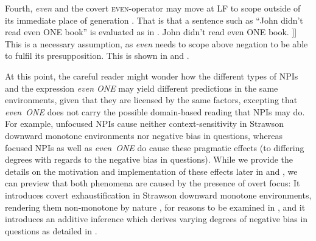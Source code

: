 Fourth, \textit{even} and the covert {\scshape even}-operator may move at LF to scope outside of its immediate place of generation \parencite[see, amongst others,][]{Karttunen1979,Wilkinson1996,Lahiri1998}. That is that a sentence such as \enquote{John didn't read even \MakeUppercase{one} book} is evaluated as in .
\pex\label{ex:even-movement}
\a John didn't read even \MakeUppercase{one} book.
\a[] [even\textsubscript{C} [not \sout{even\textsubscript{C}} [John read one\textsubscript{F} book]]]
\xe
This is a necessary assumption, as \textit{even} needs to scope above negation to be able to fulfil its presupposition. This is shown in  and .

At this point, the careful reader might wonder how the different types of NPIs and the expression \textit{even ONE} may yield different predictions in the same environments, given that they are licensed by the same factors, excepting that \textit{even~ONE} does not carry the possible domain-based reading that NPIs may do. For example, unfocused NPIs cause neither context-sensitivity in Strawson downward monotone environments nor negative bias in questions, whereas focused NPIs as well as \textit{even~ONE} do cause these pragmatic effects (to differing degrees with regards to the negative bias in questions). While we provide the details on the motivation and implementation of these effects later in  and , we can preview that both phenomena are caused by the presence of overt focus: It introduces covert exhaustification in Strawson downward monotone environments, rendering them non-monotone by nature \parencite{Klecha2014,Klecha2015}, for reasons to be examined in , and it introduces an additive inference which derives varying degrees of negative bias in questions \parencite{Jeong2021,Jeong2022} as detailed in .

